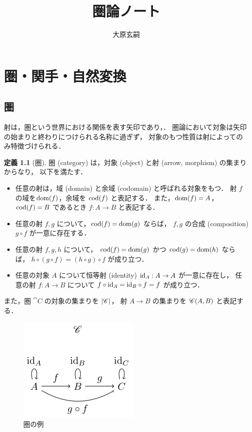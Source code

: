 \documentclass[titlepage]{ltjsreport}
\title{圏論ノート}
\author{大原玄嗣}
\theoremstyle{definition}
\newtheorem{definition}{定義}[chapter]
\begin{document}
\maketitle

\chapter{圏・関手・自然変換}

\section{圏}

射は，圏という世界における関係を表す矢印であり，．
圏論において対象は矢印の始まりと終わりにつけられる名称に過ぎず，
対象のもつ性質は射によってのみ特徴づけられる．

\begin{definition}[圏]\label{def:category}
  圏 (category) は，対象 (object) と射 (arrow, morphism) の集まりからなり，
  以下を満たす．
  \begin{itemize}
    \item 任意の射は，域 (domain) と余域 (codomain) と呼ばれる対象をもつ．
          射 $f$ の域を$\operatorname{dom}(f)$，余域を $\operatorname{cod}(f)$ と表記する．
          また，$\operatorname{dom}(f)=A$，$\operatorname{cod}(f)=B$ であるとき $f:A\to B$ と表記する．
    \item 任意の射 $f,g$ について，$\operatorname{cod}(f)=\operatorname{dom}(g)$ ならば，
          $f,g$ の合成 (composition) $g\circ f$ が一意に存在する．
    \item 任意の射 $f,g,h$ について，
          $\operatorname{cod}(f)=\operatorname{dom}(g)$ かつ $\operatorname{cod}(g)=\operatorname{dom}(h)$ ならば，
          $h\circ(g\circ f)=(h\circ g)\circ f$ が成り立つ．
    \item 任意の対象 $A$ について恒等射 (identity) $\mathrm{id}_{A}:A\to A$ が一意に存在し，
          任意の射 $f:A\to B$ について $f\circ \mathrm{id}_{A}=\mathrm{id}_{B}\circ f=f$ が成り立つ．
  \end{itemize}
  また，圏 $\cat{C}$ の対象の集まりを $|\mathscr{C}|$，
  射 $A\to B$ の集まりを $\mathscr{C}(A,B)$ と表記する．
\end{definition}

\begin{figure}[htbp]
  \centering
  \includegraphics{src/category}
  \caption{圏の例}
\end{figure}
\end{document}
